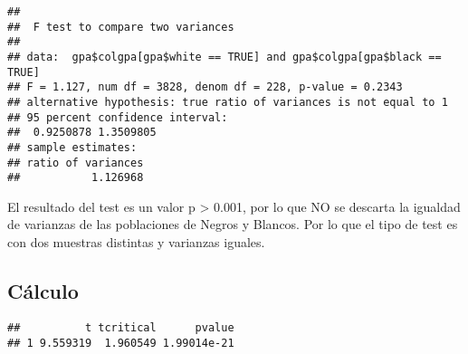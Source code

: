 \documentclass[
]{article}
\newenvironment{Shaded}{\begin{snugshade}}{\end{snugshade}}
\newcommand{\AttributeTok}[1]{\textcolor[rgb]{0.80,0.80,0.80}{#1}}
\newcommand{\CommentTok}[1]{\textcolor[rgb]{0.50,0.62,0.50}{#1}}
\newcommand{\ConstantTok}[1]{\textcolor[rgb]{0.86,0.64,0.64}{\textbf{#1}}}
\newcommand{\FunctionTok}[1]{\textcolor[rgb]{0.94,0.94,0.56}{#1}}
\newcommand{\NormalTok}[1]{\textcolor[rgb]{0.80,0.80,0.80}{#1}}
\newcommand{\SpecialCharTok}[1]{\textcolor[rgb]{0.86,0.64,0.64}{#1}}
\newcommand{\StringTok}[1]{\textcolor[rgb]{0.80,0.58,0.58}{#1}}
\begin{document}
\begin{verbatim}
## 
##  F test to compare two variances
## 
## data:  gpa$colgpa[gpa$white == TRUE] and gpa$colgpa[gpa$black == TRUE]
## F = 1.127, num df = 3828, denom df = 228, p-value = 0.2343
## alternative hypothesis: true ratio of variances is not equal to 1
## 95 percent confidence interval:
##  0.9250878 1.3509805
## sample estimates:
## ratio of variances 
##           1.126968
\end{verbatim}

El resultado del test es un valor p \textgreater{} 0.001, por lo que NO
se descarta la igualdad de varianzas de las poblaciones de Negros y
Blancos. Por lo que el tipo de test es con dos muestras distintas y
varianzas iguales.

\hypertarget{cuxe1lculo-1}{%
\subsection{Cálculo}\label{cuxe1lculo-1}}

\begin{Shaded}
\end{Shaded}

\begin{verbatim}
##          t tcritical      pvalue
## 1 9.559319  1.960549 1.99014e-21
\end{verbatim}

\begin{Shaded}
\end{Shaded}
\end{document}
